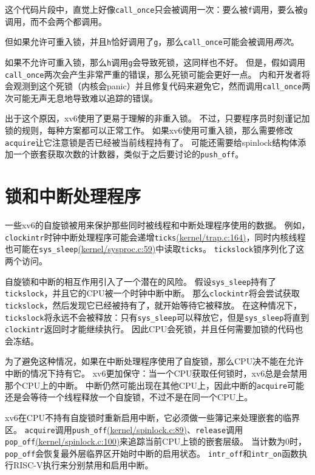 这个代码片段中，直觉上好像\texttt{call\_once}只会被调用一次：要么被\texttt{f}调用，要么被\texttt{g}调用，而不会两个都调用。

但如果允许可重入锁，并且\texttt{h}恰好调用了\texttt{g}，那么\texttt{call\_once}可能会被调用\emph{两次}。

如果不允许可重入锁，那么\texttt{h}调用\texttt{g}会导致死锁，这同样也不好。
但是，假如调用\texttt{call\_once}两次会产生非常严重的错误，那么死锁可能会更好一点。
内和开发者将会观测到这个死锁（内核会panic）并且修复代码来避免它，然而调用\texttt{call\_once}两次可能无声无息地导致难以追踪的错误。

出于这个原因，xv6使用了更易于理解的非重入锁。
不过，只要程序员时刻谨记加锁的规则，每种方案都可以正常工作。
如果xv6使用可重入锁，那么需要修改\texttt{acquire}让它注意锁是否已经被当前线程持有了。
可能还需要给spinlock结构体添加一个嵌套获取次数的计数器，类似于之后要讨论的\texttt{push\_off}。

\section{锁和中断处理程序}\label{s6-6}
一些xv6的自旋锁被用来保护那些同时被线程和中断处理程序使用的数据。
例如，\texttt{clockintr}时钟中断处理程序可能会递增\texttt{ticks}\href{https://github.com/mit-pdos/xv6-riscv/blob/riscv//kernel/trap.c#L164}{(kernel/trap.c:164)}，同时内核线程也可能在\texttt{sys\_sleep}\href{https://github.com/mit-pdos/xv6-riscv/blob/riscv//kernel/sysproc.c#L59}{(kernel/sysproc.c:59)}中读取\texttt{ticks}。
\texttt{tickslock}锁序列化了这两个访问。

自旋锁和中断的相互作用引入了一个潜在的风险。
假设\texttt{sys\_sleep}持有了\texttt{tickslock}，并且它的CPU被一个时钟中断中断。
那么\texttt{clockintr}将会尝试获取\texttt{tickslock}，然后发现它已经被持有了，就开始等待它被释放。
在这种情况下，\texttt{tickslock}将永远不会被释放：只有\texttt{sys\_sleep}可以释放它，但是\texttt{sys\_sleep}将直到\texttt{clockintr}返回时才能继续执行。
因此CPU会死锁，并且任何需要加锁的代码也会冻结。

为了避免这种情况，如果在中断处理程序使用了自旋锁，那么CPU决不能在允许中断的情况下持有它。
xv6更加保守：当一个CPU获取任何锁时，xv6总是会禁用那个CPU上的中断。
中断仍然可能出现在其他CPU上，因此中断的\texttt{acquire}可能还是会等待一个线程释放一个自旋锁，不过不是在同一个CPU上。

xv6在CPU不持有自旋锁时重新启用中断，它必须做一些簿记来处理嵌套的临界区。
\texttt{acquire}调用\texttt{push\_off}\href{https://github.com/mit-pdos/xv6-riscv/blob/riscv//kernel/spinlock.c#L89}{(kernel/spinlock.c:89)}、\texttt{release}调用\texttt{pop\_off}\href{https://github.com/mit-pdos/xv6-riscv/blob/riscv//kernel/spinlock.c#L100}{(kernel/spinlock.c:100)}来追踪当前CPU上锁的嵌套层级。
当计数为0时，\texttt{pop\_off}会恢复最外层临界区开始时中断的启用状态。
\texttt{intr\_off}和\texttt{intr\_on}函数执行RISC-V执行来分别禁用和启用中断。

